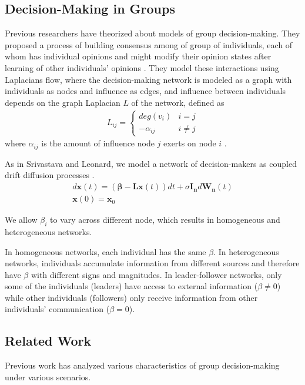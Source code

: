 \documentclass[pageno]{jpaper}
\begin{document}
\subsection{Decision-Making in Groups}
Previous researchers have theorized about models of group decision-making. They proposed a process of building consensus among of group of individuals, each of whom has individual opinions and might modify their opinion states after learning of other individuals' opinions \cite{degroot_reaching_1974}. They model these interactions using Laplacians flow, where the decision-making network is modeled as a graph with individuals as nodes and influence as edges, and influence between individuals depends on the graph Laplacian $L$ of the network, defined as
\begin{align}
L_{ij}=
\begin{cases} 
  deg(v_i) & i=j \\
  -\alpha_{ij} & i\neq j
\end{cases}
\end{align}
where $\alpha_{ij}$ is the amount of influence node $j$ exerts on node $i$
\cite{olfati-saber_consensus_2007}.

As in Srivastava and Leonard, we model a network of decision-makers as coupled drift diffusion processes \cite{srivastava_collective_2014}.
\begin{align}
d\mathbf{x}(t)=(\mathbf{\beta}-\mathbf{Lx}(t))dt+\sigma\mathbf{I_n}d\mathbf{W_n}(t)\\
\mathbf{x}(0)=\mathbf{x}_0
\end{align}

We allow $\beta_i$ to vary across different node, which results in homogeneous and heterogeneous networks.

In homogeneous networks, each individual has the same $\beta$. In heterogeneous networks, individuals accumulate information from different sources and therefore have $\beta$ with different signs and magnitudes. In leader-follower networks, only some of the individuals (leaders) have access to external information ($\beta\neq0$) while other individuals (followers) only receive information from other individuals' communication ($\beta=0$).

\subsection{Related Work}
Previous work has analyzed various characteristics of group decision-making under various scenarios.
\end{document}
